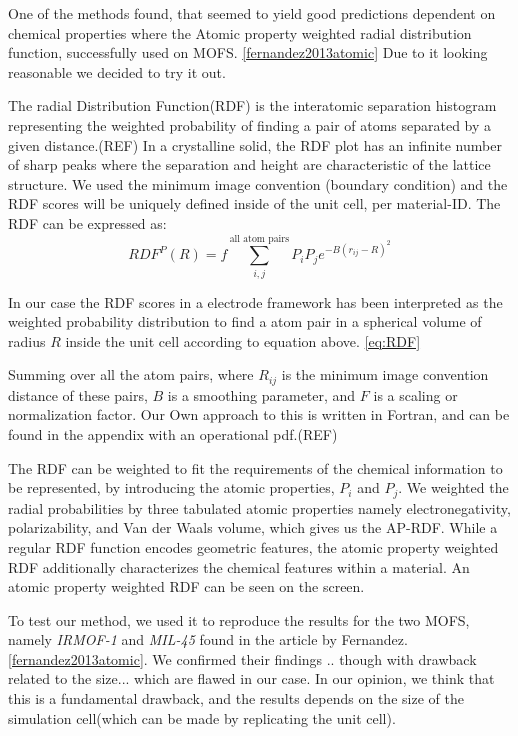 	One of the methods found, that seemed to yield good predictions dependent on chemical properties where the Atomic property weighted radial distribution function, successfully used on MOFS. \ref{fernandez2013atomic} Due to it looking reasonable we decided to try it out.

	The radial Distribution Function(RDF) is the interatomic separation histogram representing the weighted probability of finding a pair of atoms separated by a given distance.(REF) In a crystalline solid, the RDF plot has an infinite number of sharp peaks where the separation and height are characteristic of the lattice structure. We used the minimum image convention (boundary condition) and the RDF scores will be uniquely defined inside of the unit cell, per material-ID. The RDF can be expressed as:
\begin{equation}\label{eq:RDF}
RDF^P(R) = f \sum^{\text{all atom pairs}}_{i,j} P_i P_j e^{-B(r_{ij} - R)^2}
\end{equation}

In our case the RDF scores in a electrode framework has been interpreted as the weighted probability distribution to find a atom pair in a spherical volume of radius $R$ inside the unit cell according to equation above. \ref{eq:RDF}

Summing over all the atom pairs, where $R_{ij}$ is the minimum image convention distance of these pairs, $B$ is a smoothing parameter, and $F$ is a scaling or normalization factor. Our Own approach to this is written in Fortran, and can be found in the appendix with an operational pdf.(REF)

The RDF can be weighted to fit the requirements of the chemical information to be represented, by introducing the atomic properties, $P_i$ and $P_j$. We weighted the radial probabilities by three tabulated atomic properties namely electronegativity, polarizability, and Van der Waals volume, which gives us the AP-RDF. While a regular RDF function encodes geometric features, the atomic property weighted RDF additionally characterizes the chemical features within a material. An atomic property weighted RDF can be seen on the screen. 

To test our method, we used it to reproduce the results for the two MOFS, namely \textit{IRMOF-1} and \textit{MIL-45} found in the article by Fernandez.\ref{fernandez2013atomic}. We confirmed their findings .. though with drawback related to the size... which are flawed in our case.  In our opinion, we think that this is a fundamental drawback, and the results depends on the size of the simulation cell(which can be made by replicating the unit cell). 

